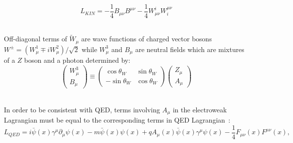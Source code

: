 \\

\begin{equation} \label{eq:L_gauge_kin}
L_{KIN}=-\frac{1}{4}B_{\mu\nu}B^{\mu\nu}-\frac{1}{4}W_{\mu\nu}^i W^{\mu\nu}_i
\end{equation}

\\

Off-diagonal terms of ${\tilde{W}}_\mu$ are wave functions of charged vector bosons $W^{\pm}=(W_\mu^1 \mp i W_\mu^2)/{\sqrt{2}}$ while $W_\mu^3$ and $B_\mu$ are neutral fields which are mixtures of a $Z$ boson and a photon determined by: \\

\begin{equation}
  \begin{pmatrix} W_\mu^3 \\ B_\mu \end{pmatrix} \equiv
  \begin{pmatrix} \cos \theta_W & \sin \theta_W \\ -\sin \theta_W & \cos \theta_W \end{pmatrix}
  \begin{pmatrix} Z_\mu \\ A_\mu \end{pmatrix}
\end{equation} 

\\

In order to be consistent with QED, terms involving $A_\mu$ in the electroweak Lagrangian must be equal to the corresponding terms in QED Lagrangian~\cite{ref_Pich}:\\

\begin{equation}\label{eq:L_QED}
L_{QED} = i \bar{\psi}(x) \gamma^\mu \partial_\mu \psi(x) - m \bar{\psi}(x) \psi(x) + q A_\mu(x) \bar{\psi}(x) \gamma^\mu \psi(x) - \frac{1}{4} F_{\mu\nu}(x) F^{\mu\nu}(x),
\end{equation}

\\

